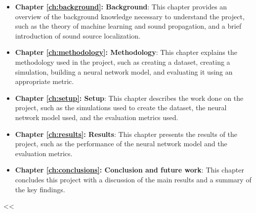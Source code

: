 \begin{itemize}
    \item \textbf{Chapter \ref{ch:background}: Background}: This chapter provides an overview of the background knowledge necessary to understand the project, such as the theory of machine learning and sound propagation, and a brief introduction of sound source localization.
    \item \textbf{Chapter \ref{ch:methodology}: Methodology}: This chapter explains the methodology used in the project, such as creating a dataset, creating a simulation, building a neural network model, and evaluating it using an appropriate metric.
    \item \textbf{Chapter \ref{ch:setup}: Setup}: This chapter describes the work done on the project, such as the simulations used to create the dataset, the neural network model used, and the evaluation metrics used.
    \item \textbf{Chapter \ref{ch:results}: Results}: This chapter presents the results of the project, such as the performance of the neural network model and the evaluation metrics.
    \item \textbf{Chapter \ref{ch:conclusions}: Conclusion and future work}: This chapter concludes this project with a discussion of the main results and a summary of the key findings.
\end{itemize}
<<